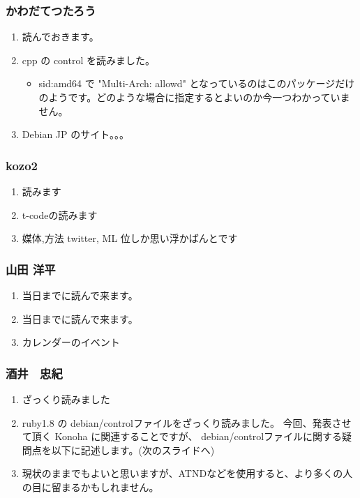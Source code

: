 \documentclass[cjk,dvipdfmx,12pt,%
hyperref={bookmarks=true,bookmarksnumbered=true,bookmarksopen=false,%
colorlinks=false,%
pdftitle={第 57 回 関西 Debian 勉強会},%
pdfauthor={倉敷・のがた・河田・佐々木},%
pdfsubject={資料},%
}]{beamer}
\begin{document}
\begin{frame}[fragile]
\frametitle{ かわだてつたろう }
  \begin{enumerate}
  \item 読んでおきます。
  \item cpp の control を読みました。
    \begin{itemize}
    \item sid:amd64 で "Multi-Arch: allowd" となっているのはこのパッケージだけのようです。どのような場合に指定するとよいのか今一つわかっていません。
    \end{itemize}
  \item Debian JP のサイト。。。
  \end{enumerate}
\end{frame}

\begin{frame}[fragile]
\frametitle{ kozo2 }
  \begin{enumerate}
  \item 読みます
  \item t-codeの読みます
  \item 媒体,方法 twitter, ML 位しか思い浮かばんとです
  \end{enumerate}
\end{frame}

\begin{frame}[fragile]
\frametitle{ 山田 洋平 }
  \begin{enumerate}
  \item 当日までに読んで来ます。
  \item 当日までに読んで来ます。
  \item カレンダーのイベント
  \end{enumerate}
\end{frame}

\begin{frame}[fragile]
\frametitle{ 酒井　忠紀 }
\begin{enumerate}
  \item ざっくり読みました
  \item ruby1.8 の debian/controlファイルをざっくり読みました。
    今回、発表させて頂く Konoha に関連することですが、
    debian/controlファイルに関する疑問点を以下に記述します。(次のスライドへ)
  \item 現状のままでもよいと思いますが、ATNDなどを使用すると、より多くの人の目に留まるかもしれません。
\end{enumerate}
\end{frame}
\end{document}
